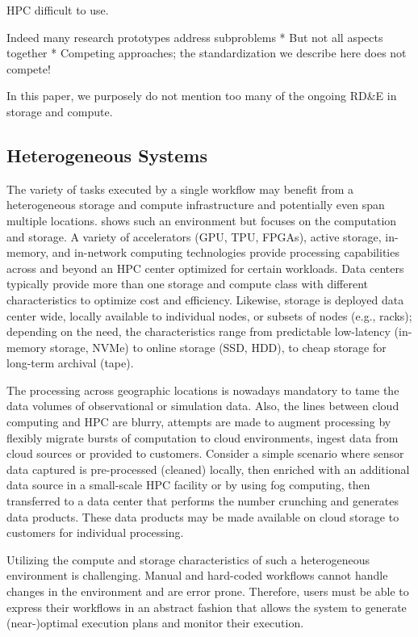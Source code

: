 \documentclass[a4paper, twocolumn]{article}
\begin{document}
HPC difficult to use.


Indeed many research prototypes address subproblems
* But not all aspects together
* Competing approaches; the standardization we describe here does not compete!

In this paper, we purposely do not mention too many of the ongoing RD\&E in storage and compute.

\subsection{Heterogeneous Systems}

The variety of tasks executed by a single workflow may benefit from a heterogeneous storage and compute infrastructure and potentially even span multiple locations.
 shows such an environment but focuses on the computation and storage.
A variety of accelerators (GPU, TPU, FPGAs), active storage, in-memory, and in-network computing technologies provide processing capabilities across and beyond an HPC center optimized for certain workloads.
Data centers typically provide more than one storage and compute class with different characteristics to optimize cost and efficiency.
Likewise, storage is deployed data center wide, locally available to individual nodes, or subsets of nodes (e.g., racks); depending on the need, the characteristics range from predictable low-latency (in-memory storage, NVMe) to online storage (SSD, HDD), to cheap storage for long-term archival (tape).

The processing across geographic locations is nowadays mandatory to tame the data volumes of observational or simulation data.
Also, the lines between cloud computing and HPC are blurry, attempts are made to augment processing by flexibly migrate bursts of computation to cloud environments, ingest data from cloud sources or provided to customers.
Consider a simple scenario where sensor data captured is pre-processed (cleaned) locally, then enriched with an additional data source in a small-scale HPC facility or by using fog computing, then transferred to a data center that performs the number crunching and generates data products.
These data products may be made available on cloud storage to customers for individual processing.

Utilizing the compute and storage characteristics of such a heterogeneous environment is challenging.
Manual and hard-coded workflows cannot handle changes in the environment and are error prone.
Therefore, users must be able to express their workflows in an abstract fashion that allows the system to generate (near-)optimal execution plans and monitor their execution.
\end{document}
